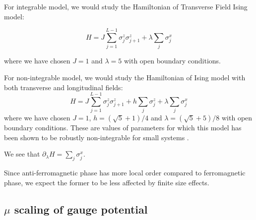 \documentclass[11pt,a4paper]{article}
\begin{document}
For integrable model, we would study the Hamiltonian of Transverse Field Ising model:

\begin{equation}
H= J \sum_{j=1}^{L-1} \sigma_j^z \sigma_{j+1}^z + \lambda \sum_{j} \sigma_j^x
\end{equation}


where we have chosen $J=1$ and $\lambda=5$ with open boundary conditions.

For non-integrable model, we would study the Hamiltonian of Ising model with both transverse and longitudinal fields:
\begin{equation}
H= J \sum_{j=1}^{L-1} \sigma_j^z \sigma_{j+1}^z + h\sum_{j} \sigma_j^z +\lambda \sum_{j} \sigma_j^x 
\end{equation}
%
where we have chosen $J=1$, $h= (\sqrt{5}+1)/4$ and $\lambda=(\sqrt{5}+5)/8$ with open boundary conditions. These are values of parameters for which this model has been shown to be robustly non-integrable for small systems \cite{kim2013ballistic}.

We see that $\partial_{\lambda}H =  \sum_{j} \sigma_j^x  $.

Since anti-ferromagnetic phase has more local order compared to ferromagnetic phase, we expect the former to be less affected by finite size effects.





\subsection{$\mu$ scaling of gauge potential}
\end{document}
